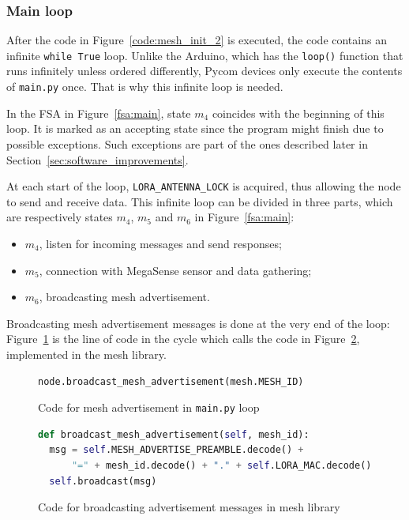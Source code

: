 			\subsubsection{Main loop}\label{subsec:loop}
	
				After the code in Figure~\ref{code:mesh_init_2} is executed, the code contains an infinite \texttt{while True} loop.
				Unlike the Arduino, which has the \texttt{loop()} function that runs infinitely unless ordered differently, Pycom devices only execute the contents of \texttt{main.py} once. 
				That is why this infinite loop is needed.
				
				In the FSA in Figure~\ref{fsa:main}, state $ m_{4} $ coincides with the beginning of this loop.
				It is marked as an accepting state since the program might finish due to possible exceptions.
				Such exceptions are part of the ones described later in Section~\ref{sec:software_improvements}.
				
				At each start of the loop, \texttt{LORA\_ANTENNA\_LOCK} is acquired, thus allowing the node to send and receive data.
				This infinite loop can be divided in three parts, which are respectively states $ m_4 $, $ m_5 $ and $ m_6 $ in Figure~\ref{fsa:main}:
				\begin{itemize}
					\item $ m_4 $, listen for incoming messages and send responses;
					\item $ m_5 $, connection with MegaSense sensor and data gathering;
					\item $ m_6 $, broadcasting mesh advertisement.
				\end{itemize}	
			
				Broadcasting mesh advertisement messages is done at the very end of the loop:  Figure~\ref{code:mesh_advertisement_main} is the line of code in the cycle which calls the code in Figure~\ref{code:mesh_advertisement_library}, implemented in the mesh library.
			
				\begin{figure}[h]
					\begin{lstlisting}[language=python]
node.broadcast_mesh_advertisement(mesh.MESH_ID)
					\end{lstlisting}
					\caption{Code for mesh advertisement in \texttt{main.py} loop}
					\label{code:mesh_advertisement_main}
				\end{figure}
				
				\begin{figure}[h]
					\begin{lstlisting}[language=python]
def broadcast_mesh_advertisement(self, mesh_id):
  msg = self.MESH_ADVERTISE_PREAMBLE.decode() + 
      "=" + mesh_id.decode() + "." + self.LORA_MAC.decode()
  self.broadcast(msg)
					\end{lstlisting}
					\caption{Code for broadcasting advertisement messages in mesh library}
					\label{code:mesh_advertisement_library}
				\end{figure}
			
